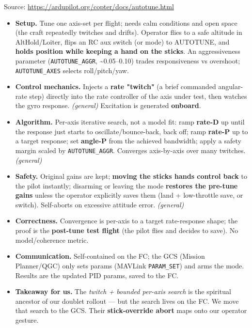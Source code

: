 \documentclass[
  11pt,
]{article}
\providecommand{\tightlist}{%
  \setlength{\itemsep}{0pt}\setlength{\parskip}{0pt}}
\begin{document}
Source: \url{https://ardupilot.org/copter/docs/autotune.html}

\begin{itemize}
\tightlist
\item
  \textbf{Setup.} Tune one axis-set per flight; needs calm conditions
  and open space (the craft repeatedly twitches and drifts). Operator
  flies to a safe altitude in AltHold/Loiter, flips an RC aux switch (or
  mode) to AUTOTUNE, and \textbf{holds position while keeping a hand on
  the sticks}. An aggressiveness parameter (\texttt{AUTOTUNE\_AGGR},
  \textasciitilde0.05--0.10) trades responsiveness vs overshoot;
  \texttt{AUTOTUNE\_AXES} selects roll/pitch/yaw.
\item
  \textbf{Control mechanics.} Injects a \textbf{rate "twitch"} (a brief
  commanded angular- rate step) directly into the rate controller of the
  axis under test, then watches the gyro response. \emph{(general)}
  Excitation is generated \textbf{onboard}.
\item
  \textbf{Algorithm.} Per-axis iterative search, not a model fit: ramp
  \textbf{rate-D} up until the response just starts to
  oscillate/bounce-back, back off; ramp \textbf{rate-P} up to a target
  response; set \textbf{angle-P} from the achieved bandwidth; apply a
  safety margin scaled by \texttt{AUTOTUNE\_AGGR}. Converges
  axis-by-axis over many twitches. \emph{(general)}
\item
  \textbf{Safety.} Original gains are kept; \textbf{moving the sticks
  hands control back} to the pilot instantly; disarming or leaving the
  mode \textbf{restores the pre-tune gains} unless the operator
  explicitly saves them (land + low-throttle save, or switch).
  Self-aborts on excessive attitude error. \emph{(general)}
\item
  \textbf{Correctness.} Convergence is per-axis to a target
  rate-response shape; the proof is the \textbf{post-tune test flight}
  (the pilot flies and decides to save). No model/coherence metric.
\item
  \textbf{Communication.} Self-contained on the FC; the GCS (Mission
  Planner/QGC) only sets params (MAVLink \texttt{PARAM\_SET}) and arms
  the mode. Results are the updated PID params, saved to the FC.
\item
  \textbf{Takeaway for us.} The \emph{twitch + bounded per-axis search}
  is the spiritual ancestor of our doublet rollout --- but the search
  lives on the FC. We move that search to the GCS. Their
  \textbf{stick-override abort} maps onto our operator gesture.
\end{itemize}
\end{document}
